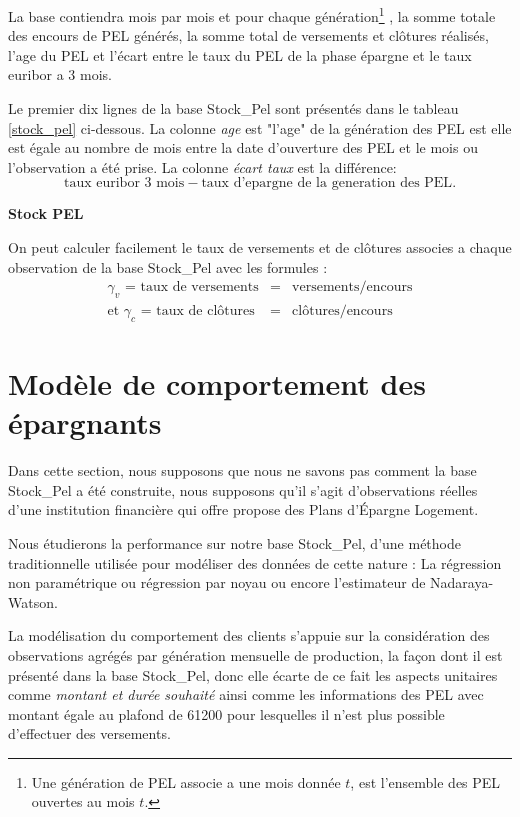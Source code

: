 \documentclass[12pt, a4paper]{book}
\begin{document}
La base contiendra mois par mois et pour chaque génération\footnote{Une génération de PEL associe a une mois donnée $t$, est l'ensemble des PEL ouvertes au mois $t$.}  , la somme totale des encours de PEL générés, la somme total de versements et clôtures réalisés, l'age du PEL et l'écart entre le taux du PEL de la phase épargne et le taux euribor a 3 mois.

Le premier dix lignes de la base Stock\_Pel sont présentés dans le tableau \ref{stock_pel} ci-dessous. La colonne {\it age} est "l'age" de la génération des PEL est elle est égale au nombre de mois entre la date d'ouverture des PEL et le mois ou l'observation a été prise. La colonne {\it écart taux} est la différence:
$$ \mbox{taux euribor 3 mois} - \mbox{taux d'epargne de la generation des PEL}.$$

\begin{table}[h!]
	\caption{\bf Stock PEL}
	\bigskip	
	\label{stock_pel}
	\centering
\end{table}

On peut calculer facilement le taux de versements et de clôtures associes a chaque observation de la base Stock\_Pel avec les formules :
\begin{eqnarray}
\gamma_v \mbox{ = taux de versements} &=& \mbox{versements} / \mbox{encours}\nonumber\\
\mbox{et }\gamma_c \mbox{ = taux de cl\^{o}tures} &=& \mbox{cl\^{o}tures} /\mbox{encours}\nonumber
\end{eqnarray}

\section{Modèle de comportement des épargnants}

Dans cette section, nous supposons que nous ne savons pas comment la base Stock\_Pel a été construite, nous supposons qu'il s'agit d'observations réelles d'une institution financière qui offre propose des Plans d'Épargne Logement. 

Nous étudierons la performance sur notre base Stock\_Pel, d'une méthode traditionnelle utilisée pour modéliser des données de cette nature : La régression non paramétrique ou régression par noyau ou encore l'estimateur de Nadaraya-Watson.

La modélisation du comportement des clients s'appuie sur la considération des observations agrégés par génération mensuelle de production, la façon dont il est présenté dans la base Stock\_Pel, donc  elle écarte de ce fait les aspects unitaires comme {\it montant et durée souhaité} ainsi comme les informations des PEL avec montant égale au plafond de 61200 pour lesquelles il n'est plus possible d'effectuer des versements.
\end{document}
